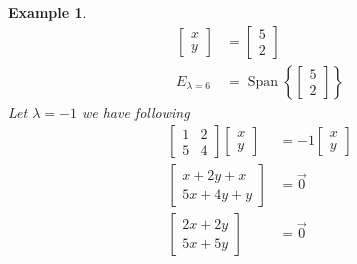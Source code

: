 \documentclass{article}
\DeclareMathOperator{\SPAN}{Span}
\newtheorem{example}{Example}
\begin{document}
\begin{example}
\begin{align*}
        \left[ \begin{array}{c}   
        x \\
        y
        \end{array} \right] &=  
        \left[ \begin{array}{c}   
        5 \\
        2 
        \end{array} \right] \\ 
        \mathit{E}_{\lambda=6} &= \SPAN \left\{
            \left[ \begin{array}{c}   
            5 \\
            2 
            \end{array} \right]
        \right\}
\end{align*}
Let $\lambda = -1$ we have following
\begin{align*}
        \begin{bmatrix}
        1 & 2 \\
        5 & 4  
        \end{bmatrix} 
        \left[ \begin{array}{c} 
        x \\
        y 
        \end{array} 
        \right]  &= 
        -1\left[ \begin{array}{c} 
        x \\
        y 
        \end{array} \right] \\
        \left[ \begin{array}{c} 
        x + 2y + x\\
        5x + 4y + y 
        \end{array} 
        \right] &= \vec{0} \\
        \left[ \begin{array}{c} 
        2x + 2y \\
        5x + 5y 
        \end{array} 
        \right] &= \vec{0} \\

\end{align*}
\end{example}
\end{document}
